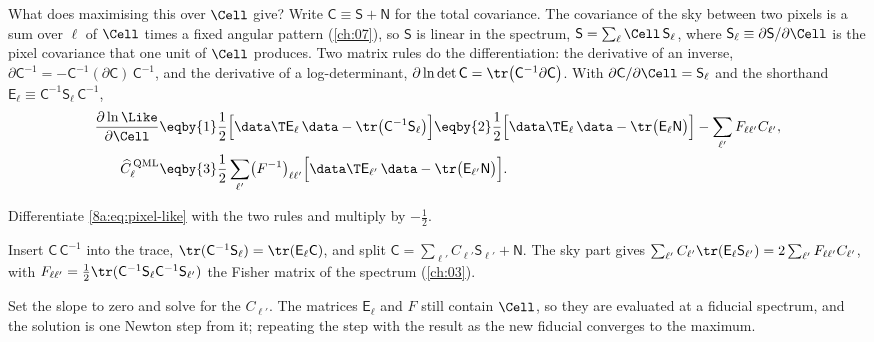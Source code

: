 What does maximising this over $\Cell$ give? Write $\mathsf C\equiv\mathsf S+\mathsf N$ for the
total covariance. The covariance of the sky between two pixels is a sum over $\ell$ of $\Cell$
times a fixed angular pattern (\cref{ch:07}), so $\mathsf S$ is linear in the spectrum,
$\mathsf S=\sum_\ell\Cell\,\mathsf S_\ell$, where $\mathsf S_\ell\equiv\partial\mathsf S/\partial\Cell$ is
the pixel covariance that one unit of $\Cell$ produces. Two matrix rules do the
differentiation: the derivative of an inverse,
$\partial\mathsf C^{-1}=-\mathsf C^{-1}(\partial\mathsf C)\,\mathsf C^{-1}$, and the derivative of a
log-determinant, $\partial\ln\det\mathsf C=\tr\bigl(\mathsf C^{-1}\partial\mathsf C\bigr)$. With
$\partial\mathsf C/\partial\Cell=\mathsf S_\ell$ and the shorthand
$\mathsf E_\ell\equiv\mathsf C^{-1}\mathsf S_\ell\,\mathsf C^{-1}$,
\begin{align}
  \frac{\partial\ln\Like}{\partial\Cell}
  &\eqby{1}\frac12\Bigl[\data\T\mathsf E_\ell\,\data-\tr\bigl(\mathsf C^{-1}\mathsf S_\ell\bigr)\Bigr]
   \eqby{2}\frac12\Bigl[\data\T\mathsf E_\ell\,\data-\tr\bigl(\mathsf E_\ell\mathsf N\bigr)\Bigr]
     -\sum_{\ell'}F_{\ell\ell'}C_{\ell'} ,
  \nonumber\\
  \widehat C_\ell^{\,\rm QML}
  &\eqby{3}\frac12\sum_{\ell'}\bigl(F^{-1}\bigr)_{\ell\ell'}
   \Bigl[\data\T\mathsf E_{\ell'}\,\data-\tr\bigl(\mathsf E_{\ell'}\mathsf N\bigr)\Bigr].
  \label{8a:eq:qml}
\end{align}
\begin{explain}
  \item Differentiate \eqref{8a:eq:pixel-like} with the two rules and multiply by $-\tfrac12$.
  \item Insert $\mathsf C\,\mathsf C^{-1}$ into the trace, $\tr(\mathsf C^{-1}\mathsf S_\ell)=\tr(\mathsf E_\ell\mathsf C)$,
        and split $\mathsf C=\sum_{\ell'}C_{\ell'}\mathsf S_{\ell'}+\mathsf N$. The sky part gives
        $\sum_{\ell'}C_{\ell'}\tr(\mathsf E_\ell\mathsf S_{\ell'})=2\sum_{\ell'}F_{\ell\ell'}C_{\ell'}$, with
        $F_{\ell\ell'}=\frac12\tr(\mathsf C^{-1}\mathsf S_\ell\mathsf C^{-1}\mathsf S_{\ell'})$ the Fisher
        matrix of the spectrum (\cref{ch:03}).
  \item Set the slope to zero and solve for the $C_{\ell'}$. The matrices $\mathsf E_\ell$ and
        $F$ still contain $\Cell$, so they are evaluated at a fiducial spectrum, and the solution is
        one Newton step from it; repeating the step with the result as the new fiducial converges to
        the maximum.
\end{explain}
